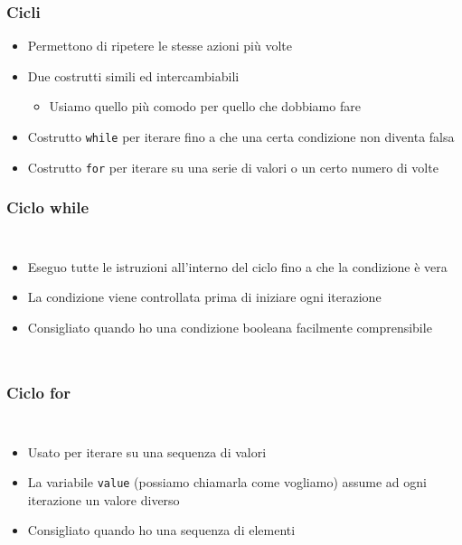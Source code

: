 
\begin{contentframe}
    \frametitle{Cicli}

    \begin{itemize}
        \item Permettono di ripetere le stesse azioni più volte

        \bigskip
        \item Due costrutti simili ed intercambiabili
        \begin{itemize}
            \item Usiamo quello più comodo per quello che dobbiamo fare
        \end{itemize}
        
        \bigskip
        \item Costrutto \texttt{while} per iterare fino a che una certa condizione non diventa falsa
        \item Costrutto \texttt{for} per iterare su una serie di valori o un certo numero di volte
    \end{itemize}
\end{contentframe}

\begin{contentframe}
    \frametitle{Ciclo while}

    \begin{columns}
        \begin{itemize}
            \item Eseguo tutte le istruzioni all'interno del ciclo fino a che la condizione è vera
            \item La condizione viene controllata prima di iniziare ogni iterazione

            \bigskip
            \item Consigliato quando ho una condizione booleana facilmente comprensibile
        \end{itemize}
        
        \centering
    \end{columns}
\end{contentframe}

\begin{contentframe}
    \frametitle{Ciclo for}

    \begin{columns}
        \begin{itemize}
            \item Usato per iterare su una sequenza di valori
            \item La variabile \texttt{value} (possiamo chiamarla come vogliamo) assume ad ogni iterazione un valore diverso

            \bigskip
            \item Consigliato quando ho una sequenza di elementi
        \end{itemize}
        
        \centering
    \end{columns}
\end{contentframe}

